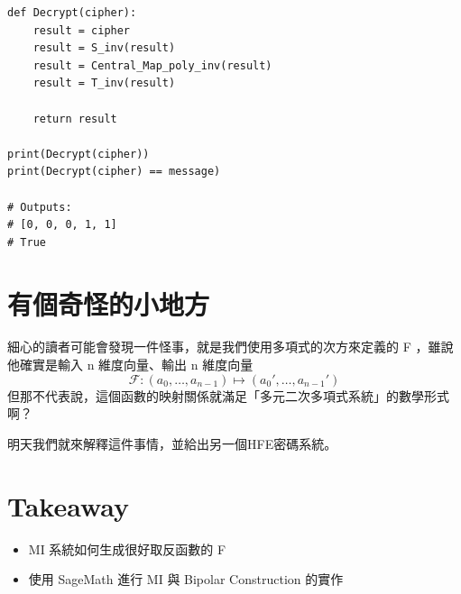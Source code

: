 \documentclass[
]{article}
\providecommand{\tightlist}{%
  \setlength{\itemsep}{0pt}\setlength{\parskip}{0pt}}
\begin{document}
\begin{verbatim}
def Decrypt(cipher):
    result = cipher
    result = S_inv(result)
    result = Central_Map_poly_inv(result)
    result = T_inv(result)

    return result

print(Decrypt(cipher))
print(Decrypt(cipher) == message)

# Outputs:
# [0, 0, 0, 1, 1]
# True
\end{verbatim}

\hypertarget{ux6709ux500bux5947ux602aux7684ux5c0fux5730ux65b9}{%
\section{有個奇怪的小地方}\label{ux6709ux500bux5947ux602aux7684ux5c0fux5730ux65b9}}

細心的讀者可能會發現一件怪事，就是我們使用多項式的次方來定義的 F
，雖說他確實是輸入 n 維度向量、輸出 n 維度向量 \[
\mathcal{F}:(a_{0},\dots,a_{n-1}) \mapsto(a_{0}',\dots,a_{n-1}')
\]
但那不代表說，這個函數的映射關係就滿足「多元二次多項式系統」的數學形式啊？

明天我們就來解釋這件事情，並給出另一個HFE密碼系統。

\hypertarget{takeaway}{%
\section{Takeaway}\label{takeaway}}

\begin{itemize}
\tightlist
\item
  MI 系統如何生成很好取反函數的 F
\item
  使用 SageMath 進行 MI 與 Bipolar Construction 的實作
\end{itemize}
\end{document}
